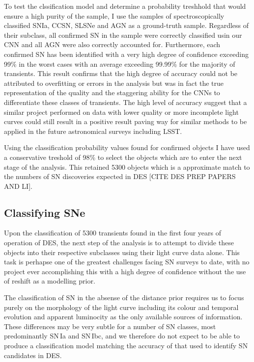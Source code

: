 To test the clssification model and determine a probability treshhold that would ensure a high purity of the sample, I use the samples of spectroscopically classified SNIa, CCSN, SLSNe and AGN as a ground-truth sample. Regardless of their subclass, all confirmed SN in the sample were correctly classified usin our CNN and all AGN were also correctly accounted for. Furthermore, each confirmed SN has been identified with a very high degree of confidence exceeding 99\% in the worst cases with an average exceeding 99.99\% for the majority of transients. This result confirms that the high degree of accuracy could not be attributed to overfitting or errors in the analysis but was in fact the true representation of the quality and the staggering ability for the CNNs to differentiate these classes of transients. The high level of accuracy suggest that a similar project performed on data with lower quality or more incomplete light curves could still result in a positive result paving way for similar methods to be applied in the future astronomical surveys including LSST.

Using the classification probability values found for confirmed objects I have used a conservative treshold of 98\% to select the objects which are to enter the next stage of the analysis. This retained 5300 objects which is a approximate match to the numbers of SN discoveries expected in DES [CITE DES PREP PAPERS AND LI].

\subsection{Classifying SNe}
Upon the classification of 5300 transients found in the first four years of operation of DES, the next step of the analysis is to attempt to divide these objects into their respective subclasses using their light curve data alone. This task is perhapse one of the greatest challenges facing SN surveys to date, with no project ever accomplishing this with a high degree of confidence without the use of reshift as a modelling prior.

The classification of SN in the absense of the distance prior requires us to focus purely on the morphology of the light curve including its colour and temporal evolution and apparent luminocity as the only available sources of information. These differences may be very subtle for a number of SN classes, most predominantly SN\,Ia and SN\,Ibc, and we therefore do not expect to be able to produce a classification model matching the accuracy of that used to identify SN candidates in DES.

